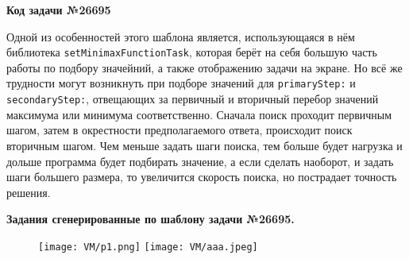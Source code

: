 \textbf{Код задачи №26695}



Одной из особенностей этого шаблона является, использующаяся в нём библиотека \texttt{setMinimaxFunctionTask}, которая берёт на себя большую часть работы по подбору значейний, а также отображению задачи на экране. Но всё же трудности могут возникнуть при подборе значений для  \texttt{primaryStep:} и \texttt{secondaryStep:}, отвещающих за первичный и вторичный перебор значений максимума или минимума соответственно. Сначала поиск проходит первичным шагом, затем в окрестности предполагаемого ответа, происходит поиск вторичным шагом. Чем меньше задать шаги поиска, тем больше будет нагрузка и дольше программа будет подбирать значение, а если сделать наоборот, и задать шаги большего размера, то увеличится скорость поиска, но пострадает точность решения.


\textbf{Задания сгенерированные по шаблону задачи №26695.}
	\begin{figure}[h]
		\centering
		\texttt{[image: VM/p1.png]}
		\texttt{[image: VM/aaa.jpeg]}
	\end{figure}

	
